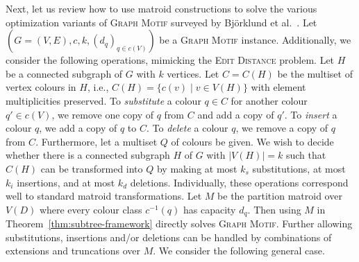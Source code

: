 \documentclass{theoretics}
\begin{document}
Next, let us review how to use matroid constructions to solve the various
optimization variants of \textsc{Graph Motif} surveyed by Björklund
et al.~\cite{BjorklundKK16}. Let $(G=(V,E), c, k, (d_q)_{q \in c(V)})$
be a \textsc{Graph Motif} instance. Additionally, we consider the
following operations, mimicking the \textsc{Edit Distance} problem.
Let $H$ be a connected subgraph of $G$ with $k$ vertices.
Let $C=C(H)$ be the multiset of vertex colours in $H$, i.e.,
$C(H)=\{c(v) \mid v \in V(H)\}$ with element multiplicities preserved.
To \emph{substitute} a colour $q \in C$ for another colour $q' \in c(V)$,
we remove one copy of $q$ from $C$ and add a copy of $q'$.
To \emph{insert} a colour $q$, we add a copy of $q$ to $C$.
To \emph{delete} a colour $q$, we remove a copy of $q$ from $C$.
Furthermore, let a multiset $Q$ of colours be given. We wish to decide
whether there is a connected subgraph $H$ of $G$ with $|V(H)|=k$
such that $C(H)$ can be transformed into $Q$
by making at most $k_s$ substitutions, at most $k_i$ insertions,
and at most $k_d$ deletions.
Individually, these operations correspond well to standard matroid
transformations. Let $M$ be the partition matroid over $V(D)$ where
every colour class $c^{-1}(q)$ has capacity $d_q$.
Then using $M$ in Theorem~\ref{thm:subtree-framework} directly solves
\textsc{Graph Motif}. Further allowing substitutions, insertions
and/or deletions can be handled by combinations of extensions and
truncations over $M$. We consider the following general case.
\end{document}
